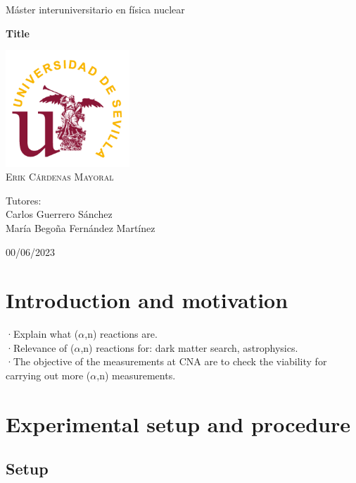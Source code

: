 \documentclass[a4paper,12pt]{report}
\author{Erik Cárdenas Mayoral}
\title{\HUGE{Title}}
\date{date}
\newcommand{\an}{($\alpha$,n) }
\begin{document}
\begin{titlepage}
	\centering
	\Huge Máster interuniversitario en física nuclear\par
	\vspace*{3cm}
	\HUGE \textbf{Title}\par
	\vspace{1cm}
	\includegraphics[width=0.35\textwidth]{us.png}\\
	\vspace{1cm}
	\Large \textsc{Erik Cárdenas Mayoral}\par
	\vspace{2cm}
	Tutores:\\
	Carlos Guerrero Sánchez\\
	María Begoña Fernández Martínez\par
	\vfill
	00/06/2023
\end{titlepage}

\begin{abstract}
Abstract
\end{abstract}

\tableofcontents

\chapter{Introduction and motivation}
·Explain what \an reactions are.\\

·Relevance of \an reactions for: dark matter search, astrophysics.\\

·The objective of the measurements at CNA are to check the viability for carrying out more \an measurements.\\


\chapter{Experimental setup and procedure}
\section{Setup}
\end{document}

